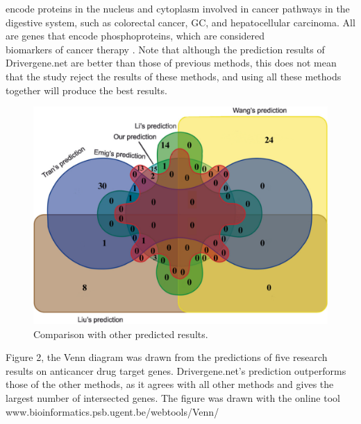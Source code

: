 \documentclass[5p,,preprint,12pt]{elsarticle}
\begin{document}
encode proteins in the nucleus and cytoplasm involved in cancer pathways in the digestive system, such as colorectal cancer, GC, and hepatocellular carcinoma. All are genes that encode phosphoproteins, which are considered \\
biomarkers of cancer therapy \cite{71}. Note that although the prediction results of Drivergene.net are better than those of previous methods, this does not mean that the study reject the results of these methods, and using all these methods together will produce the best results.

\begin{figure}[!ht]
	\centering 
	\includegraphics[scale=0.95]{images/fig2.png}
	\caption{Comparison with other predicted results.}
	\label{figure-2}
\end{figure}

Figure 2, the Venn diagram was drawn from the predictions of five research results on anticancer drug target genes. Drivergene.net’s prediction outperforms those of the other methods, as it agrees with all other methods and gives the largest number of intersected genes. The figure was drawn with the online tool \\
www.bioinformatics.psb.ugent.be/webtools/Venn/
\end{document}

